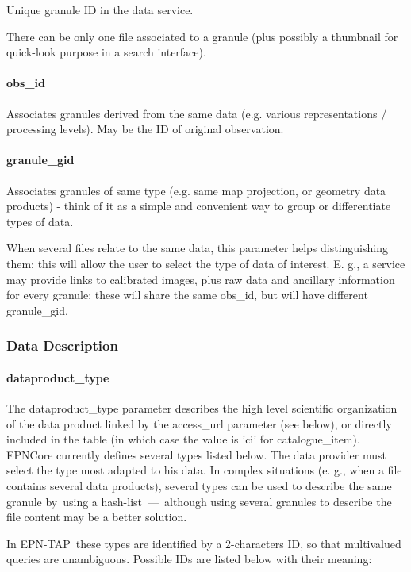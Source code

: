 \documentclass[11pt,a4paper]{ivoa}
\begin{document}
Unique granule ID in the data service.

There can be only one file associated to a granule (plus possibly a thumbnail for quick-look purpose in a search interface).

\paragraph{obs\_id}

Associates granules derived from the same data (e.g. various representations / processing levels). May be the ID of original observation.

\paragraph{granule\_gid}

Associates granules of same type (e.g. same map projection, or geometry data products) - think of it as a simple and convenient way to group or differentiate types of data.

When several files relate to the same data, this parameter helps distinguishing them: this will allow the user to select the type of data of interest. E. g., a service may provide links to calibrated images, plus raw data and ancillary information for every granule; these will share the same obs\_id, but will have different granule\_gid.

\subsubsection{Data Description}

\paragraph{dataproduct\_type}

The dataproduct\_type parameter describes the high level scientific organization of the data product linked by the access\_url parameter (see below), or directly included in the table (in which case the value is 'ci' for catalogue\_item). EPNCore currently defines several types listed below. The data provider must select the type most adapted to his data. In complex situations (e. g., when a file contains several data products), several types can be used to describe the same granule by using a hash-list — although using several granules to describe the file content may be a better solution.  

In EPN-TAP these types are identified by a 2-characters ID, so that multivalued queries are unambiguous. Possible IDs are listed below with their meaning:
\end{document}
